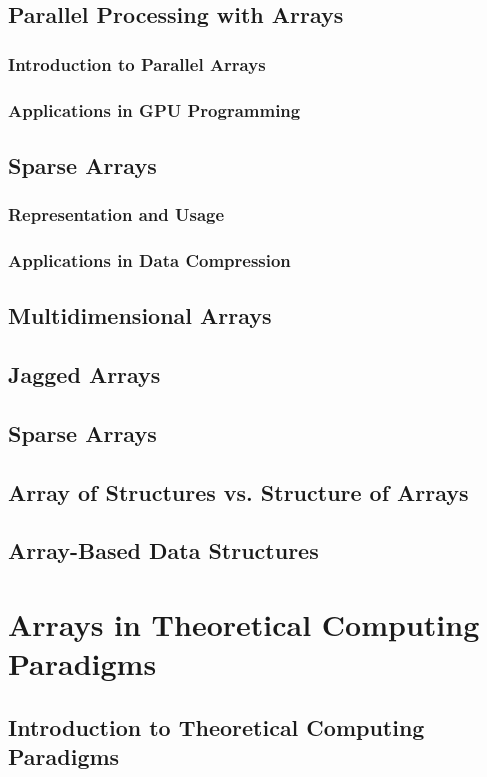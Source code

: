 \documentclass[12pt, oneside]{book}
\begin{document}
	\section{Parallel Processing with Arrays}
	\subsection{Introduction to Parallel Arrays}
	\subsection{Applications in GPU Programming}
	
	\section{Sparse Arrays}
	\subsection{Representation and Usage}
	\subsection{Applications in Data Compression}
	\section{Multidimensional Arrays}
	\section{Jagged Arrays}
	\section{Sparse Arrays}
	\section{Array of Structures vs. Structure of Arrays}
	\section{Array-Based Data Structures}

\chapter{Arrays in Theoretical Computing Paradigms}

\section{Introduction to Theoretical Computing Paradigms}
\end{document}

